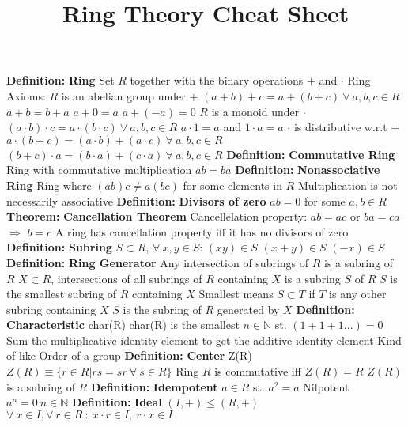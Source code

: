 \documentclass[14pt]{extarticle}
\title{Ring Theory Cheat Sheet}
\def\Definition{{\color{blue} \textbf{Definition:} }}
\def\Theorem{{\color{red} \textbf{Theorem:} }}
\begin{document}
	\maketitle

	\begin{outline}			
		\1	\Definition \textbf{Ring}
			\2	Set $R$ together with the binary operations $+$ and $\cdot$
			\2	Ring Axioms:
				\3	$R$ is an abelian group under $+$
					\4	$(a+b)+c = a+(b+c)~\forall~a,b,c \in R$
					\4	$a+b = b + a$
					\4	$a + 0 = a$
					\4	$a + (-a) = 0$
				\3	$R$ is a monoid under $\cdot$
					\4	$(a \cdot b) \cdot c = a \cdot (b \cdot c)~\forall~a,b,c \in R$
					\4	$a \cdot 1 = a$ and $1 \cdot a = a$
				\3	$\cdot$ is distributive w.r.t $+$
					\4	$a \cdot (b + c) = (a\cdot b) + (a\cdot c)~\forall~a,b,c \in R$
					\4	$(b + c) \cdot a = (b \cdot a) + (c \cdot a)~\forall~a,b,c \in R$
		\1	\Definition \textbf{Commutative Ring}
			\2	Ring with commutative multiplication $ab = ba$
		\1	\Definition \textbf{Nonassociative Ring}
			\2	Ring where $(ab)c \ne a(bc)$ for some elements in $R$
			\2	Multiplication is not necessarily associative
		\1	\Definition \textbf{Divisors of zero}
			\2	$ab = 0$ for some $a,b \in R$
		\1	\Theorem	\textbf{Cancellation Theorem}
			\2	Cancellelation property: $ab = ac$ or $ba = ca$ $\Rightarrow$ $b = c$
			\2	{\color{purple} A ring has cancellation property iff it has no divisors of zero}
		\1	\Definition \textbf{Subring}
			\2	$S \subset R$, $\forall~x,y \in S$:
				\3	$(xy) \in S$
				\3	$(x + y) \in S$
				\3	$(-x) \in S$
		\1	\Definition \textbf{Ring Generator}
			\2	Any intersection of subrings of $R$ is a subring of $R$
			\2	$X \subset R$, intersections of all subrings of $R$ containing $X$ is
					a subring $S$ of $R$
			\2	$S$ is the smallest subring of $R$ containing $X$
				\3	Smallest means $S \subset T$ if $T$ is any other subring containing $X$
			\2	$S$ is the subring of $R$ generated by $X$
		\1	\Definition \textbf{Characteristic} char(R)
			\2	char(R) is the smallest $n \in \mathbb{N}$ st. $(1 + 1 + 1...) = 0$
			\2	Sum the multiplicative identity element to get the additive identity element
			\2	Kind of like Order of a group
		\1	\Definition \textbf{Center} Z(R)
			\2	$Z(R) \equiv \{r \in R | rs = sr~\forall~s \in R\}$
			\2	Ring $R$ is commutative iff $Z(R) = R$
			\2	$Z(R)$ is a subring of $R$
		\1	\Definition \textbf{Idempotent}
			\2	$a \in R$ st. $a^2 = a$
			\2	Nilpotent $a^n = 0~n \in \mathbb{N}$
		\1	\Definition \textbf{Ideal}
			\2	$(I,+) \le (R,+)$
			\2	$\forall~x \in I, \forall~r \in R~:~x\cdot r \in I,~r\cdot x \in I$

\end{outline}
\end{document}
